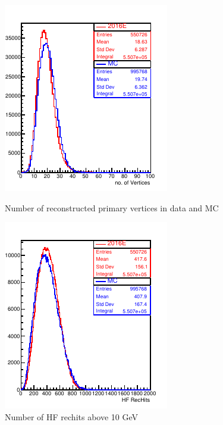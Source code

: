 \begin{figure}[h!]
\begin{minipage}[c]{0.5\linewidth}
\centering
\includegraphics[width=0.9\linewidth]{../Figures/Chap2/ImageFiles_HF/BasicPics/DataMC/nVtxDataMC}
\captionsetup{width=.9\linewidth}
\caption{Number of reconstructed primary vertices in data and MC}
\label{fig:nVtxDataMC}
\end{minipage}
\begin{minipage}[c]{0.5\linewidth}
\centering
\includegraphics[width=0.9\linewidth]{../Figures/Chap2/ImageFiles_HF/BasicPics/DataMC/nRecHitsDataMC}
\captionsetup{width=.9\linewidth}
\caption{Number of HF rechits above 10 GeV}
\label{fig:nRecHitsDataMC}
\end{minipage}
\end{figure}

